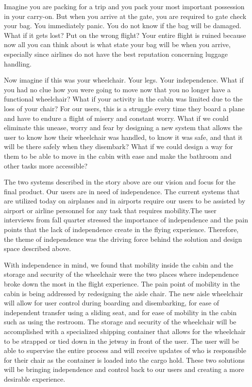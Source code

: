 Imagine you are packing for a trip and you pack your most important possession in your carry-on.   But when you arrive at the gate, you are required to gate check your bag.  You immediately panic. You do not know if the bag will be damaged. What if it gets lost? Put on the wrong flight? Your entire flight is ruined because now all you can think about is what state your bag will be when you arrive, especially since airlines do not have the best reputation concerning luggage handling. 

Now imagine if this was your wheelchair.  Your legs. Your independence. What if you had no clue how you were going to move now that you no longer have a functional wheelchair? What if your activity in the cabin was limited due to the loss of your chair?  For our users, this is a struggle every time they board a plane and have to endure a flight of misery and constant worry.  What if we could eliminate this unease, worry and fear by designing a new system that allows the user to know how their wheelchair was handled, to know it was safe, and that it will be there safely when they disembark?  What if we could design a way for them to be able to move in the cabin with ease and make the bathroom and other tasks more accessible? 

The two systems described in the story above are our vision and focus for the final product. Our users are in need of independence.  The current systems that are utilized today on airplanes and in airports require our users to be assisted by airport or airline personnel for any task that requires mobility.The user interviews from fall quarter stressed the importance of independence and the pain points that the lack of independence create in the flying experience.  Therefore, the theme of independence was the driving force behind the solution and design space described above. 

 With independence in mind, we found that mobility inside the cabin and the storage and security of the wheelchair were the two places where independence broke down the most in the flight experience. The pain point of mobility in the cabin is being addressed by redesigning the aisle chair.  The new aisle wheelchair will allow for user control during boarding and disembarking, for ease of independent transfer using a sliding seat, and for ease of mobility in the cabin such as using the restroom. The storage and security of the wheelchair will be accomplished with a specialized shipping container that allows for the wheelchair to be strapped or tied down in the jetway in front of the user. The user will be able to supervise the entire process and will receive updates of who is responsible for their chair as the container is loaded into the cargo hold.  These two solutions will be bringing independence and control back to our users and creating a more desirable experience. 


